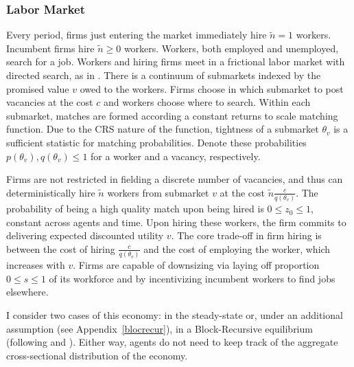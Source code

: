 \subsubsection*{Labor Market}  %
Every period, firms just entering the market immediately hire $\tilde{n}=1$ workers. Incumbent firms hire $\tilde{n}\geq 0$ workers. Workers, both employed and unemployed, search for a job. Workers and hiring firms meet in a frictional labor market with directed search, as in \textcite{moen1997}. There is a continuum of submarkets indexed by the promised value $v$ owed to the workers. Firms choose in which submarket to post vacancies at the cost $c$ and workers choose where to search. Within each submarket, matches are formed according a constant returns to scale matching function. Due to the CRS nature of the function, tightness of a submarket $\theta_v$ is a sufficient statistic for matching probabilities. Denote these probabilities $p(\theta_v),q(\theta_v)\leq 1$ for a worker and a vacancy, respectively. 

Firms are not restricted in fielding a discrete number of vacancies, and thus can deterministically hire $\tilde{n}$ workers from submarket $v$ at the cost $\tilde{n}\frac{c}{q(\theta_v)}$. The probability of being a high quality match upon being hired is $0 \leq z_0\leq 1$, constant across agents and time. Upon hiring these workers, the firm commits to delivering expected discounted utility $v$. The core trade-off in firm hiring is between the cost of hiring $\frac{c}{q(\theta_v)}$ and the cost of employing the worker, which increases with $v$.
Firms are capable of downsizing via laying off proportion $0 \leq s\leq 1$ of its workforce and by incentivizing incumbent workers to find jobs elsewhere.

I consider two cases of this economy: in the steady-state or, under an additional assumption (see Appendix~\ref{blocrecur}), in a Block-Recursive equilibrium (following \textcite{menzio2011} and \textcite{schaal2017}). Either way, agents do not need to keep track of the aggregate cross-sectional distribution of the economy.
